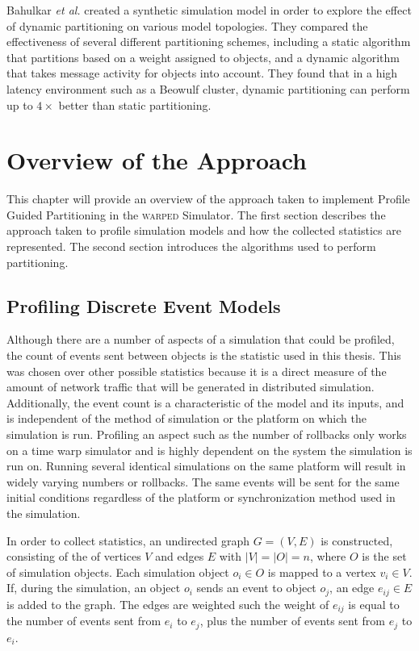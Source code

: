 \documentclass[11pt]{book}
\begin{document}
Bahulkar \emph{et al.} created a synthetic simulation model in order to explore the effect of dynamic partitioning on various model topologies. They compared the effectiveness of several different partitioning schemes, including a static algorithm that partitions based on a weight assigned to objects, and a dynamic algorithm that takes message activity for objects into account. They found that in a high latency environment such as a Beowulf cluster, dynamic partitioning can perform up to \(4\times\) better than static partitioning.


\chapter{Overview of the Approach}\label{overview}

This chapter will provide an overview of the approach taken to implement Profile Guided Partitioning in the \textsc{warped} Simulator. The first section describes the approach taken to profile simulation models and how the collected statistics are represented. The second section introduces the algorithms used to perform partitioning.

\section{Profiling Discrete Event Models}

Although there are a number of aspects of a simulation that could be profiled, the count of events sent between objects is the statistic used in this thesis. This was chosen over other possible statistics because it is a direct measure of the amount of network traffic that will be generated in distributed simulation. Additionally, the event count is a characteristic of the model and its inputs, and is independent of the method of simulation or the platform on which the simulation is run. Profiling an aspect such as the number of rollbacks only works on a time warp simulator and is highly dependent on the system the simulation is run on. Running several identical simulations on the same platform will result in widely varying numbers or rollbacks. The same events will be sent for the same initial conditions regardless of the platform or synchronization method used in the simulation.

In order to collect statistics, an undirected graph \(G=(V,E)\) is constructed, consisting of the of vertices \(V\) and edges \(E\) with \(|V| = |O| = n\), where \(O\) is the set of simulation objects. Each simulation object \(o_i \in O\) is mapped to a vertex \(v_i \in V\). If, during the simulation, an object \(o_i\) sends an event to object \(o_j\), an edge \(e_{ij} \in E\) is added to the graph. The edges are weighted such the weight of \(e_{ij}\) is equal to the number of events sent from \(e_i\) to \(e_j\), plus the number of events sent from \(e_j\) to \(e_i\).
\end{document}
